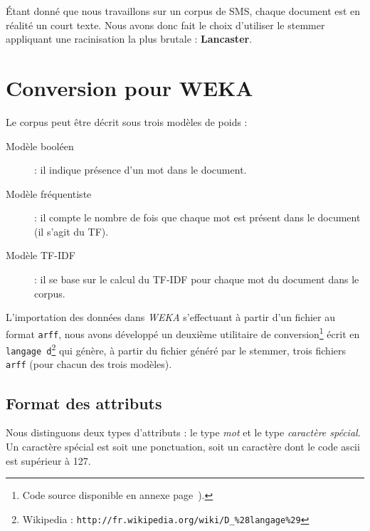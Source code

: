 Étant donné que nous travaillons sur un corpus de SMS, chaque document est en réalité un court texte. Nous avons donc fait le choix d'utiliser le stemmer appliquant une racinisation la plus brutale : \textbf{Lancaster}.

\section{Conversion pour WEKA}
Le corpus peut être décrit sous trois modèles de poids :

\begin{description}
\item[Modèle booléen] : il indique présence d'un mot dans le document.
\item[Modèle fréquentiste] : il compte le nombre de fois que chaque mot est présent dans le document (il s'agit du TF).
\item[Modèle TF-IDF] : il se base sur le calcul du TF-IDF pour chaque mot du document dans le corpus.
\end{description}

L'importation des données dans \textit{WEKA} s'effectuant à partir d'un fichier au format \texttt{arff}, nous avons développé un deuxième utilitaire de conversion\footnote{Code source disponible en annexe page~\pageref{annexe:conv}).} écrit en \texttt{langage d}\footnote{Wikipedia : \texttt{http://fr.wikipedia.org/wiki/D\_\%28langage\%29}} qui génère, à partir du fichier généré par le stemmer, trois fichiers \texttt{arff} (pour chacun des trois modèles).

\subsection*{Format des attributs}

Nous distinguons deux types d'attributs : le type \textit{mot} et le type \textit{caractère spécial}. Un caractère spécial est soit une ponctuation, soit un caractère dont le code ascii est supérieur à 127.


